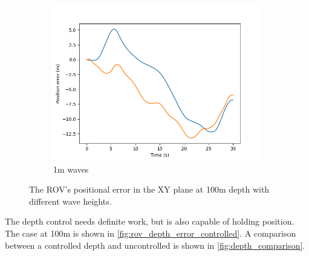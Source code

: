 \documentclass[class=article, crop=false]{standalone}
\begin{document}
\begin{figure}
\begin{subfigure}{0.65\textwidth}
        \includegraphics{scenario1/rov-100m/1.0m/rov_position_error_controlled}
        \caption{1m waves}
        \label{fig:position_controlled_1m}
    \end{subfigure}
    \vfill
    \caption{The ROV's positional error in the XY plane at 100m depth with different wave heights.}
    \label{fig:rov_position_error_controlled}
\end{figure}

The depth control needs definite work, but is also capable of holding position. The case at 100m is shown in \cref{fig:rov_depth_error_controlled}. A comparison between a controlled depth and uncontrolled is shown in \cref{fig:depth_comparison}.
\end{document}
